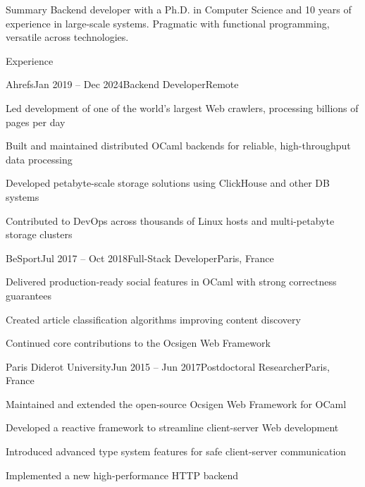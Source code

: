 \documentclass[11pt]{resume}
\begin{document}
\begin{rSection}{Summary}
Backend developer with a Ph.D. in Computer Science and 10 years of
experience in large-scale systems. Pragmatic with functional
programming, versatile across technologies.
\end{rSection}

\begin{rSection}{Experience}

  \begin{rSubsection}{Ahrefs}{Jan 2019 -- Dec 2024}{Backend
      Developer}{Remote}
  \item Led development of one of the world’s largest Web crawlers,
    processing billions of pages per day
  \item Built and maintained distributed OCaml backends for reliable,
    high-throughput data processing
  \item Developed petabyte-scale storage solutions using ClickHouse
    and other DB systems
  \item Contributed to DevOps across thousands of Linux hosts and
    multi-petabyte storage clusters
  \end{rSubsection}

  \begin{rSubsection}{BeSport}{Jul 2017 -- Oct 2018}{Full-Stack
      Developer}{Paris, France}
  \item Delivered production-ready social features in OCaml with
    strong correctness guarantees
  \item Created article classification algorithms improving content
    discovery
  \item Continued core contributions to the Ocsigen Web Framework
  \end{rSubsection}

  \begin{rSubsection}{Paris Diderot University}{Jun 2015 -- Jun
      2017}{Postdoctoral Researcher}{Paris, France}
  \item Maintained and extended the open-source Ocsigen Web Framework
    for OCaml
  \item Developed a reactive framework to streamline client-server Web
    development
  \item Introduced advanced type system features for safe
    client-server communication
  \item Implemented a new high-performance HTTP backend
  \end{rSubsection}

\end{rSection}
\end{document}
